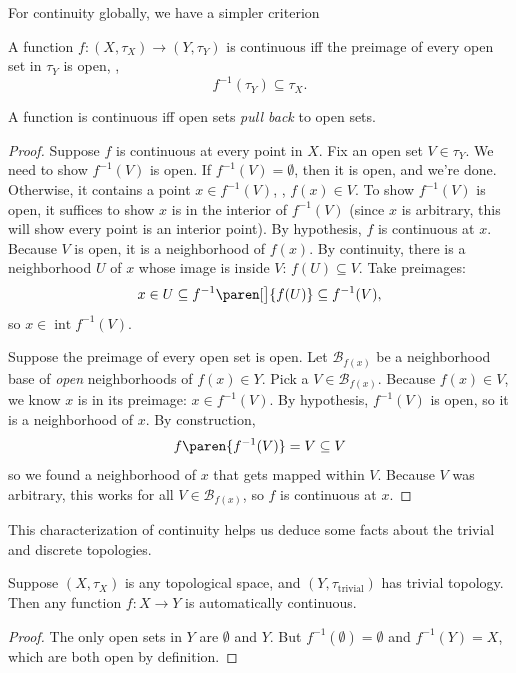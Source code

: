 \documentclass[a5paper]{scrbook}
\DeclareMathOperator{\interior}{int}
\def\nhoodbase{{\mathcal {B}}}
\begin{document}
  For continuity globally, we have a simpler criterion
  \begin{theorem}
    A function \(f:(X,\tau_X)\to (Y,\tau_Y)\) is continuous iff the preimage of every open set in \(\tau_Y\) is open, \ie,
    \[
      f^{-1}(\tau_Y) \subseteq \tau_X. 
    \]

    A function is continuous iff open sets \emph{pull back} to open sets. 
  \end{theorem}
  \begin{proof}
    Suppose \(f\) is continuous at every point in \(X\).
    Fix an open set \(V\in \tau_Y\). We need to show \(f^{-1}(V)\) is open.
    If \(f^{-1}(V)=\emptyset\), then it is open, and we're done. Otherwise, it contains a point 
    \(x\in f^{-1}(V)\), \ie, \(f(x)\in V\). To show \(f^{-1}(V)\) is open, it suffices to show \(x\) is in the interior of \(f^{-1}(V)\) (since \(x\) is arbitrary, this will show every point is an interior point). By hypothesis, \(f\) is continuous at \(x\). Because \(V\) is open, it is a neighborhood of \(f(x)\). By continuity, there is a neighborhood \(U\) of \(x\) whose image is inside \(V\): \(f(U)\subseteq V \). 
    Take preimages:
    \[
      x\in U \subseteq f^{-1}\paren[\big]{f(U)} \subseteq f^{-1}(V),
    \]
    so \(x\in\interior f^{-1}(V)\). 

    Suppose the preimage of every open set is open. Let \(\nhoodbase_{f(x)}\) be a neighborhood base of \emph{open} neighborhoods of \(f(x)\in Y\). Pick a \(V\in\nhoodbase_{f(x)}\). Because \(f(x)\in V\), we know \(x\) is in its preimage: \(x \in f^{-1}(V)\). By hypothesis, \(f^{-1}(V)\) is open, so it is a neighborhood of \(x\). By construction,
    \[
      f\paren{f^{-1}(V) } = V \subseteq V
    \]
    so we found a neighborhood of \(x\) that gets mapped within \(V\). Because \(V\) was arbitrary, this works for all \(V\in\nhoodbase_{f(x)}\), so \(f\) is continuous at \(x\). 
  \end{proof}
  This characterization of continuity helps us deduce some facts about the trivial and discrete topologies.
  \begin{theorem}
    Suppose \((X,\tau_X)\) is any topological space, and \((Y,\tau_{\text{trivial}})\) has trivial topology. Then any function \(f:X\to Y\) is automatically continuous. 
  \end{theorem}
  \begin{proof}
    The only open sets in \(Y\) are \(\emptyset\) and \(Y\). But \(f^{-1}(\emptyset)=\emptyset\) and \(f^{-1}(Y)=X\), which are both open by definition.
  \end{proof}
\end{document}
